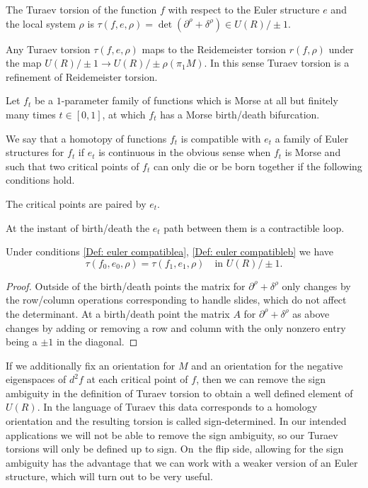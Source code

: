 \begin{definition}
The Turaev torsion of the function $f$ with respect to the Euler structure $e$ and the local system $\rho$ is $\tau( f,e, \rho)=\det(\partial^\rho + \delta^\rho) \in U(R) / \pm 1$.
\end{definition}

Any Turaev torsion $\tau(f, e, \rho)$ maps to the Reidemeister torsion $r(f, \rho)$ under the map $U(R) / \pm 1 \to U(R) / \pm \rho( \pi_1M)$. In this sense Turaev torsion is a refinement of Reidemeister torsion.

Let $f_t$ be a $1$-parameter family of functions which is Morse at all but finitely many times $t \in [0,1]$, at which $f_t$ has a Morse birth/death bifurcation.

\begin{definition}\label{Def: euler compatible} We say that a homotopy of functions $f_t$ is compatible with $e_t$ a family of Euler structures for $f_t$ if $e_t$ is continuous in the obvious sense when $f_t$ is Morse and such that two critical points of $f_t$ can only die or be born together if the following conditions hold.
\begin{enumeratea}
\item\label{Def: euler compatiblea}
The critical points are paired by $e_t$.
\item\label{Def: euler compatibleb}
At the instant of birth/death the $e_t$ path between them is a contractible loop.
\end{enumeratea}
\end{definition}

\begin{lemma}\label{inv}
Under conditions \eqref{Def: euler compatiblea}, \eqref{Def: euler compatibleb} we have
\[
\tau(f_0,e_0, \rho)=\tau(f_1,e_1, \rho)\quad\text{in }U(R) / \pm1.
\]
\end{lemma}

\begin{proof}
Outside of the birth/death points the matrix for $\partial^\rho + \delta^\rho$ only changes by the row/column operations corresponding to handle slides, which do not affect the determinant. At a birth/death point the matrix $A$ for $\partial^\rho + \delta^\rho$ as above changes by adding or removing a row and column with the only nonzero entry being a $\pm 1$ in the diagonal. \end{proof}

If we additionally fix an orientation for $M$ and an orientation for the negative eigenspaces of $d^2f$ at each critical point of $f$, then we can remove the sign ambiguity in the definition of Turaev torsion to obtain a well defined element of $ U(R)$. In the language of Turaev this data corresponds to a homology orientation and the resulting torsion is called sign-determined. In our intended applications we will not be able to remove the sign ambiguity, so our Turaev torsions will only be defined up to sign. On~the flip side, allowing for the sign ambiguity has the advantage that we can work with a weaker version of an Euler structure, which will turn out to be very useful.

